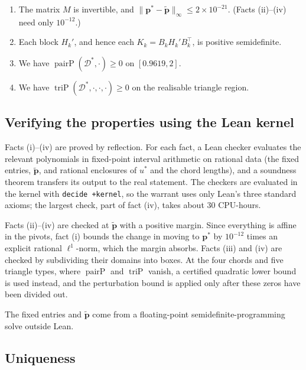 \documentclass[11pt]{article}
\theoremstyle{definition}
\theoremstyle{remark}
\newcommand{\pairP}{\operatorname{pairP}}
\newcommand{\triP}{\operatorname{triP}}
\begin{document}
\begin{enumerate}
  \item[(i)] The matrix $M$ is invertible, and
    $\lVert\mathbf{p}^*-\tilde{\mathbf{p}}\rVert_\infty\le2\times10^{-21}$. (Facts (ii)--(iv) need only $10^{-12}$.)
  \item[(ii)] Each block $H_k'$, and hence each $K_k=B_kH_k'B_k^\top$, is
    positive semidefinite.
  \item[(iii)] We have $\pairP(\mathcal{D}^*,\cdot)\ge0$ on $[0.9619,2]$.
  \item[(iv)] We have $\triP(\mathcal{D}^*,\cdot,\cdot,\cdot)\ge0$ on the realisable
    triangle region.
\end{enumerate}

\subsection{Verifying the properties using the Lean kernel}
\label{sec:method-verification}

Facts (i)--(iv) are proved by reflection. For each fact, a Lean checker
evaluates the relevant polynomials in fixed-point interval arithmetic on
rational data (the fixed entries, $\tilde{\mathbf{p}}$, and rational
enclosures of $u^*$ and the chord lengths), and a soundness theorem
transfers its output to the real statement. The checkers are evaluated
in the kernel with \texttt{decide +kernel}, so the warrant uses only Lean's
three standard axioms; the largest check, part of fact (iv), takes about
30 CPU-hours.

Facts (ii)--(iv) are checked at $\tilde{\mathbf{p}}$ with a positive
margin. Since everything is affine in the pivots, fact (i) bounds the
change in moving to $\mathbf{p}^*$ by $10^{-12}$ times an explicit
rational $\ell^1$-norm, which the margin absorbs. Facts (iii) and (iv)
are checked by subdividing their domains into boxes. At the four chords
and five triangle types, where $\pairP$ and $\triP$ vanish, a certified
quadratic lower bound is used instead, and the perturbation bound is
applied only after these zeros have been divided out.

The fixed entries and $\tilde{\mathbf{p}}$ come from a floating-point
semidefinite-programming solve outside Lean.


\subsection{Uniqueness}
\label{sec:method-uniqueness}
\end{document}
